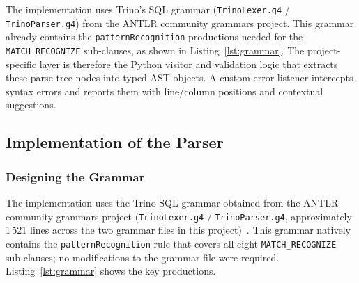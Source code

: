 The implementation uses Trino's SQL grammar
(\texttt{TrinoLexer.g4} / \texttt{TrinoParser.g4}) from the ANTLR
community grammars project.  This grammar already contains the
\texttt{patternRecognition} productions needed for the
\texttt{MATCH\_RECOGNIZE} sub-clauses, as shown in
Listing~\ref{lst:grammar}.  The project-specific layer is therefore
the Python visitor and validation logic that extracts these parse
tree nodes into typed AST objects.  A custom error listener
intercepts syntax errors and reports them with line/column positions
and contextual suggestions.

\subsection{Implementation of the Parser}
\label{subsec:meth-parser-impl}

\subsubsection{Designing the Grammar}
\label{subsubsec:meth-grammar-design}

The implementation uses the Trino SQL grammar obtained from the
ANTLR community grammars project
(\texttt{TrinoLexer.g4} / \texttt{TrinoParser.g4},
approximately 1\,521 lines across the two grammar files in this
project)~\cite{antlr_trino_sql}.
This grammar natively contains the \texttt{patternRecognition} rule
that covers all eight \texttt{MATCH\_RECOGNIZE} sub-clauses; no
modifications to the grammar file were required.
Listing~\ref{lst:grammar} shows the key productions.

